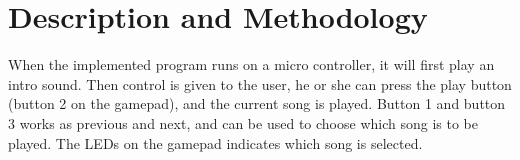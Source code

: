 \section{Description and Methodology}
When the implemented program runs on a micro controller, it will first play an intro sound.
Then control is given to the user, he or she can press the play button (button 2 on the gamepad), and the current song is played.
Button 1 and button 3 works as previous and next, and can be used to choose which song is to be played.
The LEDs on the gamepad indicates which song is selected.
